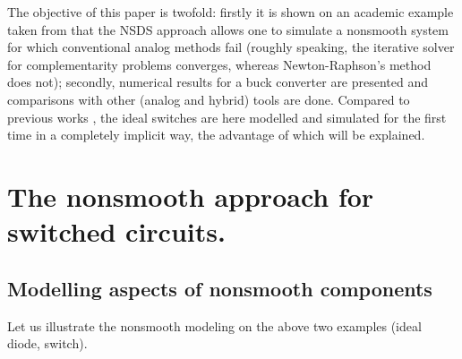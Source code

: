 The objective of this paper is twofold: firstly it is shown on an academic example taken from \cite{maffezzoni2006} that the NSDS approach allows one to simulate a nonsmooth system for which conventional analog methods fail (roughly speaking, the iterative solver for complementarity problems converges, whereas Newton-Raphson's method does not); secondly, numerical results for a buck converter are presented and comparisons with other (analog and hybrid) tools are done.  Compared to previous works \cite{glocker2005,vasca2009}, the ideal switches are here modelled and simulated for the first time in a completely implicit way, the advantage of which will be explained.  


\section{The nonsmooth approach for switched circuits.}
\label{section2}

\subsection{Modelling aspects of nonsmooth components}
\label{section21}

 Let us illustrate the nonsmooth modeling on the above two examples (ideal diode, switch).
 \renewcommand{\labelenumi}{\alph{enumi})}
